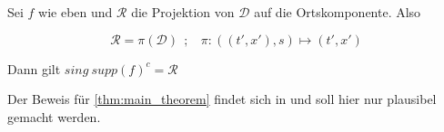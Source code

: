 \begin{corollary}
Sei $f$ wie eben und $\mathcal{R}$ die Projektion von $\mathcal{D}$ auf die  Ortskomponente. Also

\begin{equation}
    \mathcal{R} = \pi (\mathcal{D})~~;~~~~
    \pi : ((t',x'),s) \mapsto (t',x')
\end{equation}

Dann gilt $sing ~supp (f)^c = \mathcal{R}$
\end{corollary}


Der Beweis für \cref{thm:main_theorem} findet sich in \textcite[S.19 ff]{Kutyniok2008} und soll hier nur plausibel gemacht werden.


